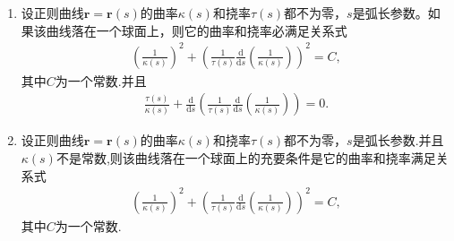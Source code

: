 \documentclass[../../main.tex]{subfiles}%
\begin{document}
\begin{theorem}\label{theorem:曲线落在球面上的性质}
\begin{enumerate}[(1)]
\item 设正则曲线$\bm{r} = \bm{r}(s)$的曲率$\kappa(s)$和挠率$\tau(s)$都不为零，$s$是弧长参数。如果该曲线落在一个球面上，则它的曲率和挠率必满足关系式
\begin{align*}
\left( \frac{1}{\kappa(s)} \right)^2 + \left( \frac{1}{\tau(s)} \frac{\mathrm{d}}{\mathrm{d}s} \left( \frac{1}{\kappa(s)} \right) \right)^2 = C,
\end{align*}
其中$C$为一个常数.并且
\begin{align*}
\frac{\tau(s)}{\kappa(s)} + \frac{\mathrm{d}}{\mathrm{d}s} \left( \frac{1}{\tau(s)} \frac{\mathrm{d}}{\mathrm{d}s} \left( \frac{1}{\kappa(s)} \right) \right) = 0.
\end{align*}

\item 设正则曲线$\bm{r} = \bm{r}(s)$的曲率$\kappa(s)$和挠率$\tau(s)$都不为零，$s$是弧长参数.并且$\kappa(s)$不是常数,则该曲线落在一个球面上的充要条件是它的曲率和挠率满足关系式
\begin{align*}
\left( \frac{1}{\kappa(s)} \right)^2 + \left( \frac{1}{\tau(s)} \frac{\mathrm{d}}{\mathrm{d}s} \left( \frac{1}{\kappa(s)} \right) \right)^2 = C,
\end{align*}
其中$C$为一个常数.
\end{enumerate}
\end{theorem}
\end{document}

